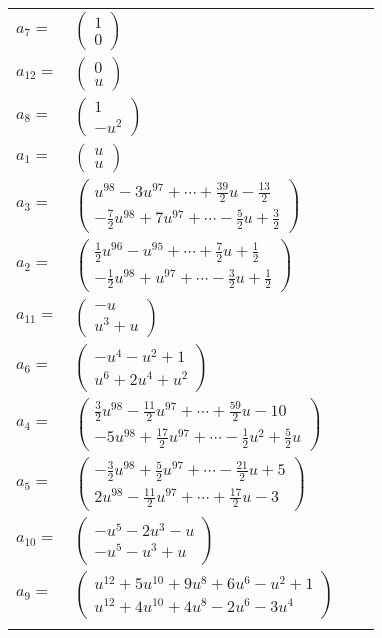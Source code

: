 \documentclass[1p]{elsarticle_modified}
\theoremstyle{definition}
\begin{document}
\begin{tabular}{m{7pt} m{180pt} m{7pt} m{180pt} }
\flushright $a_{7}=$&$\begin{pmatrix}1\\0\end{pmatrix}$ \\
\flushright $a_{12}=$&$\begin{pmatrix}0\\u\end{pmatrix}$ \\
\flushright $a_{8}=$&$\begin{pmatrix}1\\- u^2\end{pmatrix}$ \\
\flushright $a_{1}=$&$\begin{pmatrix}u\\u\end{pmatrix}$ \\
\flushright $a_{3}=$&$\begin{pmatrix}u^{98}-3 u^{97}+\cdots+\frac{39}{2} u-\frac{13}{2}\\-\frac{7}{2} u^{98}+7 u^{97}+\cdots-\frac{5}{2} u+\frac{3}{2}\end{pmatrix}$ \\
\flushright $a_{2}=$&$\begin{pmatrix}\frac{1}{2} u^{96}- u^{95}+\cdots+\frac{7}{2} u+\frac{1}{2}\\-\frac{1}{2} u^{98}+u^{97}+\cdots-\frac{3}{2} u+\frac{1}{2}\end{pmatrix}$ \\
\flushright $a_{11}=$&$\begin{pmatrix}- u\\u^3+u\end{pmatrix}$ \\
\flushright $a_{6}=$&$\begin{pmatrix}- u^4- u^2+1\\u^6+2 u^4+u^2\end{pmatrix}$ \\
\flushright $a_{4}=$&$\begin{pmatrix}\frac{3}{2} u^{98}-\frac{11}{2} u^{97}+\cdots+\frac{59}{2} u-10\\-5 u^{98}+\frac{17}{2} u^{97}+\cdots-\frac{1}{2} u^2+\frac{5}{2} u\end{pmatrix}$ \\
\flushright $a_{5}=$&$\begin{pmatrix}-\frac{3}{2} u^{98}+\frac{5}{2} u^{97}+\cdots-\frac{21}{2} u+5\\2 u^{98}-\frac{11}{2} u^{97}+\cdots+\frac{17}{2} u-3\end{pmatrix}$ \\
\flushright $a_{10}=$&$\begin{pmatrix}- u^5-2 u^3- u\\- u^5- u^3+u\end{pmatrix}$ \\
\flushright $a_{9}=$&$\begin{pmatrix}u^{12}+5 u^{10}+9 u^8+6 u^6- u^2+1\\u^{12}+4 u^{10}+4 u^8-2 u^6-3 u^4\end{pmatrix}$\\&\end{tabular}
\end{document}
